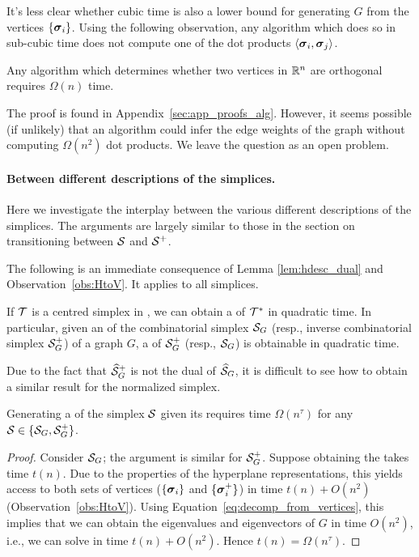 It's less  clear whether cubic time is also a lower bound for generating $G$ from the vertices $\{\vb*{\sigma}_i\}$. Using  the  following observation, any algorithm which does so in  sub-cubic time does not compute one of the dot products $\langle \vb*{\sigma}_i,\vb*{\sigma}_j\rangle$. 

\begin{observation}
	\label{obs:dot_product_time}
	Any algorithm which  determines whether two vertices in  $\mathbb{R}^n$ are  orthogonal requires  $\Omega(n)$ time. 
\end{observation}

The proof is found in Appendix~\ref{sec:app_proofs_alg}. However,  it seems possible (if unlikely) that  an algorithm could infer the edge  weights  of the graph  without computing $\Omega(n^2)$ dot products. We leave the question  as an open problem. 



\paragraph{Between different descriptions of the simplices.}
Here we investigate  the interplay between the various different descriptions of the simplices. The  arguments are largely similar  to those in the section on  transitioning between  $\mathcal{S}$ and $\mathcal{S}^+$. 

The following is an immediate consequence of Lemma \ref{lem:hdesc_dual} and Observation~\ref{obs:HtoV}. It applies to all simplices.  

\begin{corollary}
	\label{cor:hdesc_S_to_S+}
	If $\mathcal{T}$ is a centred simplex in \hdesc, we can obtain a \vdesc of $\mathcal{T}^*$ in quadratic time. In particular, given  an \hdesc of the combinatorial simplex $\mathcal{S}_G$ (resp., inverse combinatorial  simplex $\mathcal{S}_G^+$)  of a graph $G$, a \vdesc of $\mathcal{S}_G^+$ (resp., $\mathcal{S}_G$)  is obtainable in quadratic time. 
\end{corollary}

Due to the fact that $\widehat{\mathcal{S}}_G^+$ is not the dual of $\widehat{\mathcal{S}}_G$,  it is difficult to  see how to  obtain a similar result  for the normalized simplex. 

\begin{lemma}
	\label{lem:hdesc_to_vdesc}
	Generating a \vdesc of the simplex $\mathcal{S}$ given its \hdesc requires time $\Omega(n^\tau)$ for any $\mathcal{S}\in\{\mathcal{S}_G,\mathcal{S}_G^+\}$. 
\end{lemma}
\begin{proof}
	Consider $\mathcal{S}_G$; the argument is similar for $\mathcal{S}_G^+$. Suppose obtaining the \vdesc takes time $t(n)$. Due to the properties of the hyperplane representations, this yields access to both sets of vertices ($\{\vb*{\sigma}_i\}$ and $\{\vb*{\sigma}_i^+\}$) in time $t(n)+O(n^2)$ (Observation~\ref{obs:HtoV}). Using Equation~\eqref{eq:decomp_from_vertices}, this implies that we can obtain the eigenvalues and eigenvectors of $G$ in time $O(n^2)$, i.e., we can solve \lapdecomp in time $t(n)+O(n^2)$. Hence $t(n)=\Omega(n^\tau)$. 
\end{proof}


